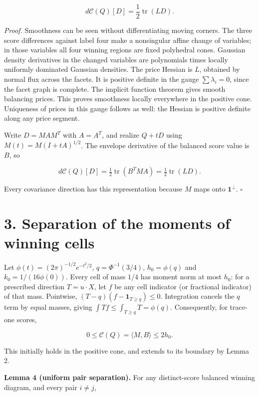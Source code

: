 \documentclass[
  11pt,
]{article}
\begin{document}
\[
 d\mathcal C(Q)[D]=\frac12\operatorname{tr}(LD).        \tag{6}
\]

\emph{Proof.} Smoothness can be seen without differentiating moving
corners. The three score differences against label four make a
nonsingular affine change of variables; in those variables all four
winning regions are fixed polyhedral cones. Gaussian density derivatives
in the changed variables are polynomials times locally uniformly
dominated Gaussian densities. The price Hessian is \(L\), obtained by
normal flux across the facets. It is positive definite in the gauge
\(\sum\lambda_i=0\), since the facet graph is complete. The implicit
function theorem gives smooth balancing prices. This proves smoothness
locally everywhere in the positive cone. Uniqueness of prices in this
gauge follows as well: the Hessian is positive definite along any price
segment.

Write \(D=MAM^T\) with \(A=A^T\), and realize \(Q+tD\) using
\(M(t)=M(I+tA)^{1/2}\). The envelope derivative of the balanced score
value is \(B\), so

\[
 d\mathcal C(Q)[D]=\tfrac12\operatorname{tr}(B^TMA)
                 =\tfrac12\operatorname{tr}(LD).
\]

Every covariance direction has this representation because \(M\) maps
onto \(\mathbf1^\perp\). \(\square\)

\section{3. Separation of the moments of winning
cells}\label{separation-of-the-moments-of-winning-cells}

Let \(\phi(t)=(2\pi)^{-1/2}e^{-t^2/2}\), \(q=\Phi^{-1}(3/4)\),
\(h_0=\phi(q)\) and \(k_0=1/(16\phi(0))\). Every cell of mass \(1/4\)
has moment norm at most \(h_0\): for a prescribed direction
\(T=u\cdot X\), let \(f\) be any cell indicator (or fractional
indicator) of that mass. Pointwise, \((T-q)(f-\mathbf1_{T\ge q})\le0\).
Integration cancels the \(q\) term by equal masses, giving
\(\int Tf\le\int_{T\ge q}T=\phi(q)\). Consequently, for trace-one
scores,

\[
 0\le\mathcal C(Q)=\langle M,B\rangle\le2h_0.          \tag{7}
\]

This initially holds in the positive cone, and extends to its boundary
by Lemma 2.

\textbf{Lemma 4 (uniform pair separation).} For any distinct-score
balanced winning diagram, and every pair \(i\ne j\),
\end{document}
